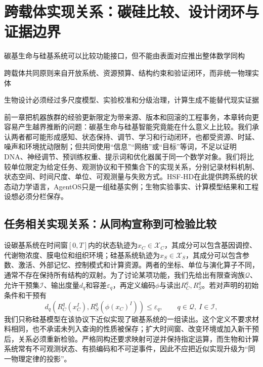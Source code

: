 \chapter{跨载体实现关系：碳硅比较、设计闭环与证据边界}

\begin{introduction}
    \item 碳基生命与硅基系统可以比较功能接口，但不能由表面对应推出整体数学同构
    \item 跨载体共同原则来自开放系统、资源预算、结构约束和验证闭环，而非统一物理实体
    \item 生物设计必须经过多尺度模型、实验校准和分级治理，计算生成不能替代现实证据
\end{introduction}

前一章把机器族群的经验更新限定为带来源、版本和回滚的工程事务，本章转向更容易产生越界推断的问题：碳基生命与硅基智能究竟能在什么意义上比较。我们承认两者都可能形成感知、状态保持、调节、学习和行动闭环，也都受资源、时延、噪声和环境扰动限制；但共同使用“信息”“网络”或“目标”等词，不足以证明DNA、神经调节、预训练权重、提示词和优化器属于同一个数学对象。我们将比较单位限定为给定任务、观测协议和干预集合下的实现关系，分别记录材料机制、状态空间、时间尺度、单位、可观测量与失败方式。HSF-HD在此提供跨系统的状态动力学语言，AgentOS只是一组硅基实例；生物实验事实、计算模型结果和工程设想必须分栏保存。

\section{任务相关实现关系：从同构宣称到可检验比较}
\label{sec:isomorphism_map}

设碳基系统在时间窗$[0,T]$内的状态轨迹为$x_C\in\mathcal{X}_C$，其成分可以包含基因调控、代谢物浓度、膜电位和组织环境；硅基系统轨迹为$x_S\in\mathcal{X}_S$，其成分可以包含参数、激活、外部记忆、控制模式和计算资源。两者的坐标、单位与演化算子不同，通常不存在保持所有结构的双射。为了讨论某项功能，我们先给出有限查询族$\mathcal{Q}$、允许干预集$\mathcal{I}$、输出度量$d_q$和容差$\varepsilon_q$，再定义编码$\phi$与读出$R_C^q,R_S^q$。若对声明的初始条件和干预有
\begin{equation}
 d_q\!\left(R_C^q(x_C^{I}),R_S^q(\phi(x_C)^{I})\right)\leq\varepsilon_q,
 \qquad q\in\mathcal{Q},\ I\in\mathcal{I},
\end{equation}
我们只称硅基模型在该协议下近似实现了碳基系统的一组读出。这个定义不要求材料相同，也不承诺未列入查询的性质被保存；扩大时间窗、改变环境或加入新干预后，关系必须重新检验。严格同构还要求映射可逆并保持指定运算，而生物和计算系统常有不可观测状态、有损编码和不可逆事件，因此不应把近似实现升级为“同一物理定律的投影”。

